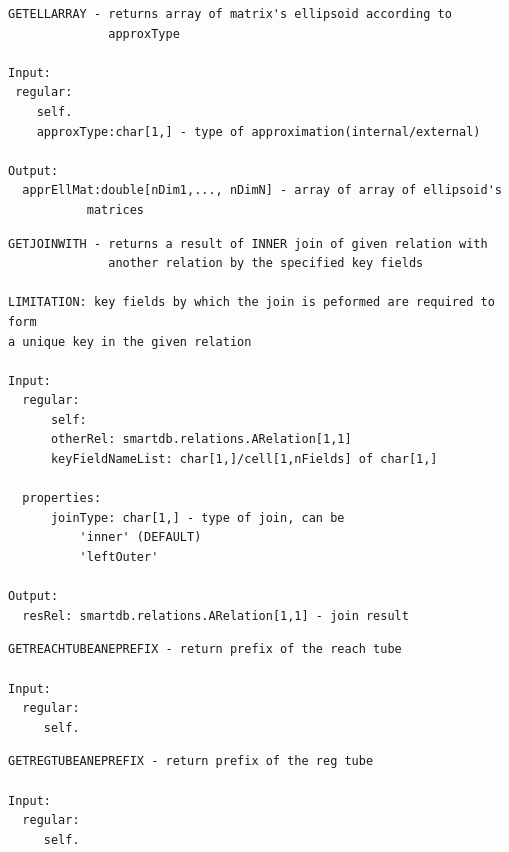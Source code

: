 \documentclass[letterpaper,10pt,english]{sphinxmanual}
\begin{document}
\begin{Verbatim}[commandchars=\\\{\}]
GETELLARRAY - returns array of matrix's ellipsoid according to
              approxType

Input:
 regular:
    self.
    approxType:char[1,] - type of approximation(internal/external)

Output:
  apprEllMat:double[nDim1,..., nDimN] - array of array of ellipsoid's
           matrices
\end{Verbatim}

\begin{Verbatim}[commandchars=\\\{\}]
GETJOINWITH - returns a result of INNER join of given relation with
              another relation by the specified key fields

LIMITATION: key fields by which the join is peformed are required to form
a unique key in the given relation

Input:
  regular:
      self:
      otherRel: smartdb.relations.ARelation[1,1]
      keyFieldNameList: char[1,]/cell[1,nFields] of char[1,]

  properties:
      joinType: char[1,] - type of join, can be
          'inner' (DEFAULT)
          'leftOuter'

Output:
  resRel: smartdb.relations.ARelation[1,1] - join result
\end{Verbatim}

\begin{Verbatim}[commandchars=\\\{\}]
GETREACHTUBEANEPREFIX - return prefix of the reach tube

Input:
  regular:
     self.
\end{Verbatim}

\begin{Verbatim}[commandchars=\\\{\}]
GETREGTUBEANEPREFIX - return prefix of the reg tube

Input:
  regular:
     self.
\end{Verbatim}
\end{document}
